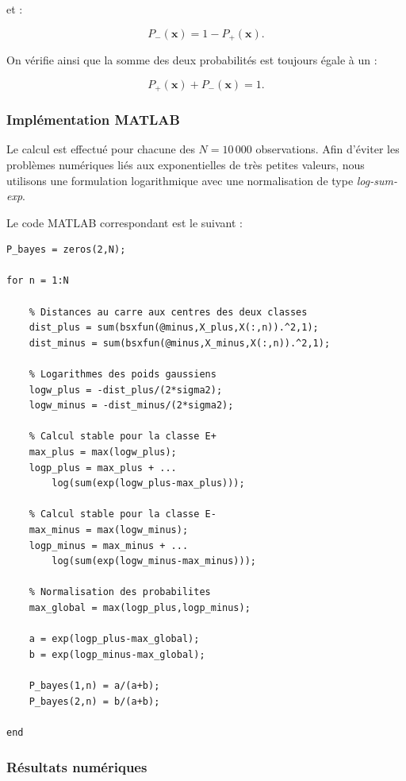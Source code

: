 et :

\begin{equation}
\boxed{
P_-(\mathbf{x})=1-P_+(\mathbf{x}).
}
\end{equation}

On vérifie ainsi que la somme des deux probabilités est
toujours égale à un :

\begin{equation}
\boxed{P_+(\mathbf{x})+P_-(\mathbf{x})=1.}
\end{equation}

\subsubsection{Implémentation MATLAB}

Le calcul est effectué pour chacune des $N=10\,000$
observations. Afin d'éviter les problèmes numériques
liés aux exponentielles de très petites valeurs, nous
utilisons une formulation logarithmique avec une
normalisation de type \textit{log-sum-exp}.

Le code MATLAB correspondant est le suivant :

\begin{verbatim}
P_bayes = zeros(2,N);

for n = 1:N

    % Distances au carre aux centres des deux classes
    dist_plus = sum(bsxfun(@minus,X_plus,X(:,n)).^2,1);
    dist_minus = sum(bsxfun(@minus,X_minus,X(:,n)).^2,1);

    % Logarithmes des poids gaussiens
    logw_plus = -dist_plus/(2*sigma2);
    logw_minus = -dist_minus/(2*sigma2);

    % Calcul stable pour la classe E+
    max_plus = max(logw_plus);
    logp_plus = max_plus + ...
        log(sum(exp(logw_plus-max_plus)));

    % Calcul stable pour la classe E-
    max_minus = max(logw_minus);
    logp_minus = max_minus + ...
        log(sum(exp(logw_minus-max_minus)));

    % Normalisation des probabilites
    max_global = max(logp_plus,logp_minus);

    a = exp(logp_plus-max_global);
    b = exp(logp_minus-max_global);

    P_bayes(1,n) = a/(a+b);
    P_bayes(2,n) = b/(a+b);

end
\end{verbatim}

\subsubsection{Résultats numériques}

